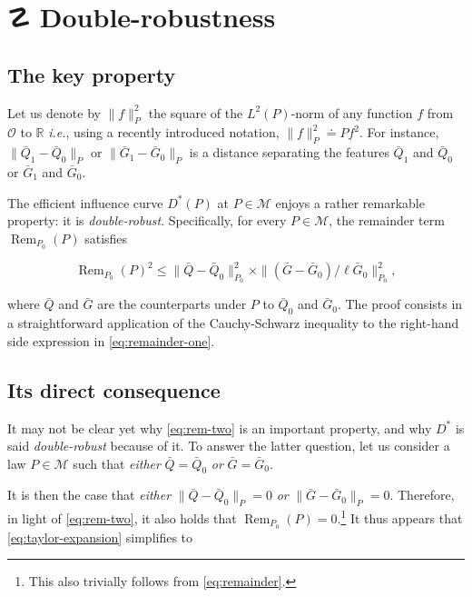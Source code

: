 \documentclass[
  11pt,
  openright,twoside]{book}
\DeclareMathOperator{\Rem}{Rem}
\DeclareRobustCommand{\stixdanger}{%
  {\usefont{U}{stixbbit}{m}{it}\symbol{"F6}}%
}
\newcommand{\bbR}{\mathbb{R}}
\newcommand{\defq}{\doteq}
\newcommand{\calM}{\mathcal{M}}
\newcommand{\calO}{\mathcal{O}}
\newcommand{\Gbar}{\bar{G}}
\newcommand{\Qbar}{\bar{Q}}
\theoremstyle{definition}
\theoremstyle{definition}
\theoremstyle{definition}
\theoremstyle{definition}
\theoremstyle{remark}
\begin{document}
\hypertarget{def-double-robustness}{%
\section{\texorpdfstring{☡ \stixdanger{} Double-robustness}{☡  Double-robustness}}\label{def-double-robustness}}

\hypertarget{the-key-property}{%
\subsection{The key property}\label{the-key-property}}

Let us denote by \(\|f\|_{P}^{2}\) the square of the \(L^{2}(P)\)-norm of any
function \(f\) from \(\calO\) to \(\bbR\) \emph{i.e.}, using a recently introduced
notation, \(\|f\|_{P}^{2} \defq Pf^{2}\). For instance, \(\|\Qbar_{1} - \Qbar_{0}\|_{P}\) or \(\|\Gbar_{1} - \Gbar_{0}\|_{P}\) is a distance separating
the features \(\Qbar_{1}\) and \(\Qbar_{0}\) or \(\Gbar_{1}\) and \(\Gbar_{0}\).

The efficient influence curve \(D^{*}(P)\) at \(P \in \calM\) enjoys a rather
remarkable property: it is \emph{double-robust}. Specifically, for every \(P \in \calM\), the remainder term \(\Rem_{P_{0}} (P)\) satisfies

\begin{equation} 
\Rem_{P_{0}}   (P)^{2}  \leq   \|\Qbar   -
\Qbar_{0}\|_{P_0}^{2}  \times   \|(\Gbar  -  \Gbar_{0})/\ell\Gbar_{0}\|_{P_0}^{2},
\label{eq:rem-two}
\end{equation}

where \(\Qbar\) and \(\Gbar\) are the counterparts under \(P\) to \(\Qbar_{0}\) and
\(\Gbar_{0}\). The proof consists in a straightforward application of the
Cauchy-Schwarz inequality to the right-hand side expression in
\eqref{eq:remainder-one}.

\hypertarget{direct-consequence}{%
\subsection{Its direct consequence}\label{direct-consequence}}

It may not be clear yet why \eqref{eq:rem-two} is an important property, and
why \(D^{*}\) is said \emph{double-robust} because of it. To answer the latter
question, let us consider a law \(P\in \calM\) such that \emph{either} \(\Qbar = \Qbar_{0}\) \emph{or} \(\Gbar = \Gbar_{0}\).

It is then the case that \emph{either} \(\|\Qbar - \Qbar_{0}\|_{P} = 0\) \emph{or}
\(\|\Gbar - \Gbar_{0}\|_{P} = 0\). Therefore, in light of \eqref{eq:rem-two}, it
also holds that \(\Rem_{P_{0}} (P) = 0\).\footnote{This also trivially follows from
  \eqref{eq:remainder}.} It thus appears that \eqref{eq:taylor-expansion}
simplifies to
\end{document}
